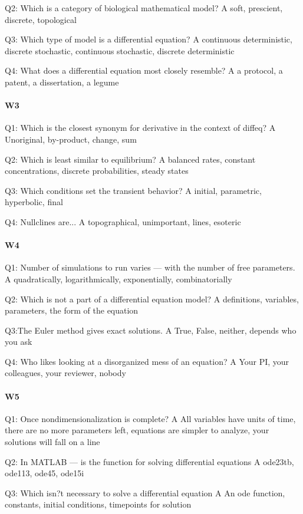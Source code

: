 Q2: Which is a category of biological mathematical model?
A soft, prescient, discrete, topological

Q3: Which type of model is a differential equation?
A continuous deterministic, discrete stochastic, continuous stochastic, discrete deterministic

Q4: What does a differential equation most closely resemble?
A a protocol, a patent, a dissertation, a legume


\paragraph{W3}
Q1: Which is the closest synonym for derivative in the context of diffeq?
A Unoriginal, by-product, change, sum

Q2: Which is least similar to equilibrium?
A balanced rates, constant concentrations, discrete probabilities, steady states

Q3: Which conditions set the transient behavior?
A initial, parametric, hyperbolic, final

Q4: Nullclines are...
A topographical, unimportant, lines, esoteric

\paragraph{W4}
Q1: Number of simulations to run varies --- with the number of free parameters.
A quadratically, logarithmically, exponentially, combinatorially

Q2: Which is not a part of a differential equation model?
A definitions, variables, parameters, the form of the equation

Q3:The Euler method gives exact solutions.
A True, False, neither, depends who you ask

Q4: Who likes looking at a disorganized mess of an equation?
A Your PI, your colleagues, your reviewer, nobody

\paragraph{W5}
Q1: Once nondimensionalization is complete?
A All variables have units of time, there are no more parameters left, equations are simpler to analyze, your solutions will fall on a line

Q2: In MATLAB --- is the function for solving differential equations
A ode23tb, ode113, ode45, ode15i

Q3: Which isn?t necessary to solve a differential equation
A An ode function, constants, initial conditions, timepoints for solution
